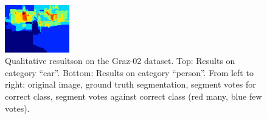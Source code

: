 \begin{figure}[tbp]
\begin{center}
        \includegraphics[width=28mm]{images/person1_neg.png}\hspace*{0.7ex}
	\end{center}
        \vspace{-7mm}
        \caption{Qualitative resultson on the Graz-02 dataset. Top: Results on
        category ``car''. Bottom: Results on category ``person''. From left to
        right: original image, ground truth segmentation, segment votes for
        correct class, segment votes against correct class (red many, blue few votes).}
        \vspace{-7mm}
\end{figure}
